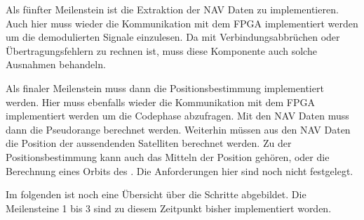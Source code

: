 Als fünfter Meilenstein ist die Extraktion der NAV Daten zu implementieren. Auch hier muss wieder die Kommunikation mit dem FPGA implementiert werden um die demodulierten Signale einzulesen. Da mit Verbindungsabbrüchen oder Übertragungsfehlern zu rechnen ist, muss diese Komponente auch solche Ausnahmen behandeln. 

Als finaler Meilenstein muss dann die Positionsbestimmung implementiert werden. Hier muss ebenfalls wieder die Kommunikation mit dem FPGA implementiert werden um die Codephase abzufragen. Mit den NAV Daten muss dann die Pseudorange berechnet werden. Weiterhin müssen aus den NAV Daten die Position der aussendenden Satelliten berechnet werden. Zu der Positionsbestimmung kann auch das Mitteln der Position gehören, oder die Berechnung eines Orbits des \dscubesat. Die Anforderungen hier sind noch nicht festgelegt.

Im folgenden ist noch eine Übersicht über die Schritte abgebildet. Die Meilensteine 1 bis 3 sind zu diesem Zeitpunkt bisher implementiert worden.

